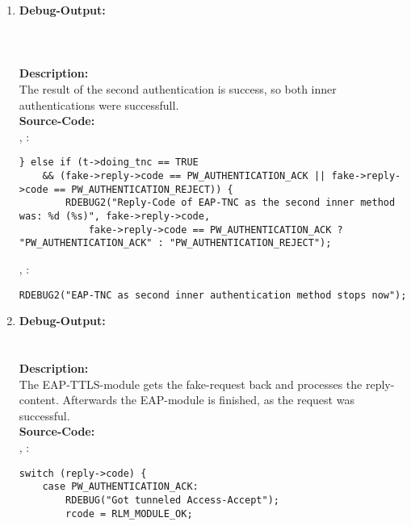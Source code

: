 \begin{enumerate}
\item \textbf{Debug-Output:}\\
\\
\\
\\
\newline
\textbf{Description:}\\
The result of the second authentication is success, so both inner authentications were successfull.\\
\newline
\textbf{Source-Code:}\\
, :
\begin{lstlisting}
} else if (t->doing_tnc == TRUE
	&& (fake->reply->code == PW_AUTHENTICATION_ACK || fake->reply->code == PW_AUTHENTICATION_REJECT)) {
		RDEBUG2("Reply-Code of EAP-TNC as the second inner method was: %d (%s)", fake->reply->code,
			fake->reply->code == PW_AUTHENTICATION_ACK ? "PW_AUTHENTICATION_ACK" : "PW_AUTHENTICATION_REJECT");
\end{lstlisting}
, :
\begin{lstlisting}
RDEBUG2("EAP-TNC as second inner authentication method stops now");
\end{lstlisting}

\item \textbf{Debug-Output:}\\
\\
\\
\newline
\textbf{Description:}\\
The EAP-TTLS-module gets the fake-request back and processes the reply-content.
Afterwards the EAP-module is finished, as the request was successful.\\
\newline
\textbf{Source-Code:}\\
, :
\begin{lstlisting}
switch (reply->code) {
	case PW_AUTHENTICATION_ACK:
		RDEBUG("Got tunneled Access-Accept");
		rcode = RLM_MODULE_OK;
\end{lstlisting}

\newpage


\end{enumerate}
